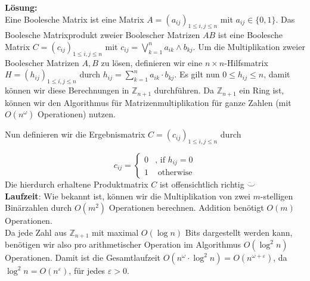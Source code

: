 \documentclass[11pt,a4paper,ngerman]{article}
\begin{document}
\textbf{Lösung:}\\

Eine Boolesche Matrix ist eine Matrix $A = \left(a_{ij} \right)_{1 \leq i,j \leq n}$
mit $a_{ij} \in \{ 0,1 \}$. Das Boolesche Matrixprodukt zweier Boolescher Matrizen $AB$ ist eine
Boolesche Matrix $C = \left(c_{ij} \right)_{1 \leq i,j \leq n}$ mit 
$c_{ij} = \bigvee_{k = 1}^{n} a_{ik} \land b_{kj}$.
Um die Multiplikation zweier Boolescher Matrizen $A,B$ zu lösen,
definieren wir eine $n \times n$-Hilfsmatrix $H = \left(h_{ij} \right)_{1 \leq i,j \leq n}$ durch
$h_{ij} = \sum_{k=1}^{n} a_{ik}\cdot b_{kj}$. Es gilt nun $0 \leq h_{ij} \leq n$, damit können wir
diese Berechnungen in $\mathbb{Z}_{n+1}$  durchführen. Da $\mathbb{Z}_{n+1}$ ein Ring ist, können 
wir den Algorithmus für Matrizenmultiplikation für ganze Zahlen (mit $O(n^\omega)$ Operationen) nutzen.

Nun definieren wir die Ergebnismatrix $C = \left(c_{ij} \right)_{1 \leq i,j \leq n}$ durch

\begin{equation*}
c_{ij} = \begin{cases}
          0 & \text{, if $h_{ij} = 0$} \\
          1 & \text{ otherwise}
       \end{cases}
\end{equation*}
Die hierdurch erhaltene Produktmatrix  $C$ ist offensichtlich richtig $\ddot\smile$\\

\textbf{Laufzeit}: Wie bekannt ist, können wir die Multiplikation von zwei $m$-stelligen Binärzahlen
durch $O(m^2)$ Operationen berechnen. Addition benötigt $O(m)$ Operationen. \\
Da jede Zahl aus $\mathbb{Z}_{n+1}$ mit maximal $O(\log n)$ Bits dargestellt werden kann, benötigen
wir also pro arithmetischer Operation im Algorithmus $O(\log^2 n)$ Operationen.
Damit ist die Gesamtlaufzeit $O(n^{\omega} \cdot \log^2 n) = O(n^{\omega + \varepsilon})$, da
$\log^2 n = O(n^\varepsilon)$, für jedes $\varepsilon > 0$.
\label{LastPage}
\end{document}
